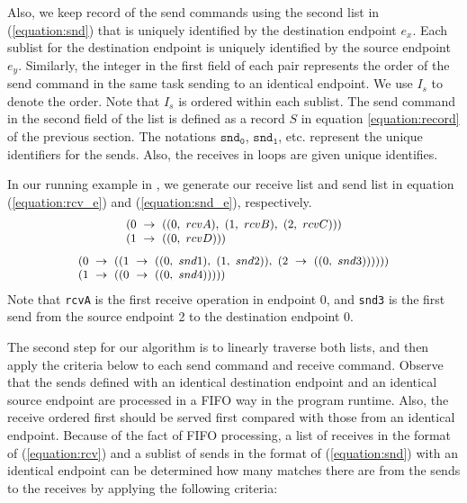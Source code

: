Also, we keep record of the send commands using the second list in (\ref{equation:snd}) that is uniquely identified by the destination endpoint $\mathit{e}_x$. Each sublist for the destination endpoint is uniquely identified by the source endpoint $\mathit{e}_y$. Similarly, the integer in the first field of each pair represents the order of the send command in the same task sending to an identical endpoint. We use $I_s$ to denote the order. Note that $I_s$ is ordered within each sublist. The send command in the second field of the list is defined as a record $S$ in equation \ref{equation:record} of the previous section. The notations $\mathtt{snd_{0}}$, $\mathtt{snd_{1}}$, etc. represent the unique identifiers for the sends. Also, the receives in loops are given unique identifies.

In our running example in , we generate our receive list and send list in equation (\ref{equation:rcv_e}) and (\ref{equation:snd_e}), respectively.
\begin{equation}
\footnotesize \begin{array}{l}
(0\ \rightarrow\ ((0,\ rcvA),\ (1,\ rcvB),\ (2,\ rcvC)))\\
(1\ \rightarrow\ ((0,\ rcvD)))\\
\end{array}
\label{equation:rcv_e}
\end{equation}
\begin{equation}
\footnotesize \begin{array}{l}
(0\ \rightarrow\ ((1\ \rightarrow\ ((0,\ snd1),\ (1,\ snd2)),\ (2\ \rightarrow\ ((0,\ snd3))))))\\
(1\ \rightarrow\ ((0\ \rightarrow\ ((0,\ snd4)))))\\
\end{array}
\label{equation:snd_e}
\end{equation}
Note that \texttt{rcvA} is the first receive operation in endpoint 0, and \texttt{snd3} is the first send from the source endpoint 2 to the destination endpoint 0.

The second step for our algorithm is to linearly traverse both lists, and then apply the criteria below to each send command and receive command. Observe that the sends defined with an identical destination endpoint and an identical source endpoint are processed in a FIFO way in the program runtime. Also, the receive ordered first should be served first compared with those from an identical endpoint. Because of the fact of FIFO processing, a list of receives in the format of (\ref{equation:rcv}) and a sublist of sends in the format of (\ref{equation:snd}) with an identical endpoint can be determined how many matches there are from the sends to the receives by applying the following criteria:

